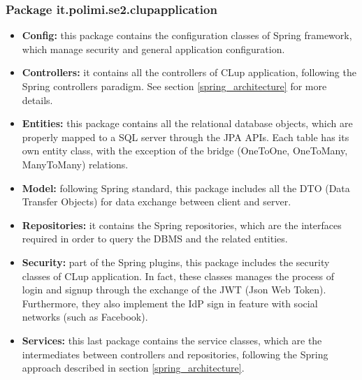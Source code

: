 \documentclass[table, 12pt]{article}
\begin{document}
\subsubsection*{Package it.polimi.se2.clupapplication}
\begin{itemize}
    \item \textbf{Config:} this package contains the configuration classes of Spring framework, which manage security and general application configuration.
    \item \textbf{Controllers:} it contains all the controllers of CLup application, following the Spring controllers paradigm. See section \ref{spring_architecture} for more details.
    \item \textbf{Entities:} this package contains all the relational database objects, which are properly mapped to a SQL server through the JPA APIs. Each table has its own entity class, with the exception of the bridge (OneToOne, OneToMany, ManyToMany) relations.
    \item \textbf{Model:} following Spring standard, this package includes all the DTO (Data Transfer Objects) for data exchange between client and server.
    \item \textbf{Repositories:} it contains the Spring repositories, which are the interfaces required in order to query the DBMS and the related entities.
    \item \textbf{Security:} part of the Spring plugins, this package includes the security classes of CLup application. In fact, these classes manages the process of login and signup through the exchange of the JWT (Json Web Token). Furthermore, they also implement the IdP sign in feature with social networks (such as Facebook).
    \item \textbf{Services:} this last package contains the service classes, which are the intermediates between controllers and repositories, following the Spring approach described in section \ref{spring_architecture}.
\end{itemize}
\end{document}
